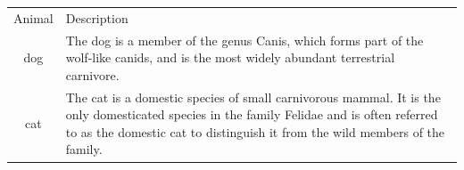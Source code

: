 \documentclass{article}
\begin{document}
	\begin{tabular}{cl}
		Animal & Description \\
		dog & The dog is a member of the genus Canis, which forms part of the wolf-like canids, and is the most widely abundant terrestrial carnivore. \\
		cat & The cat is a domestic species of small carnivorous mammal. It is the only domesticated species in the family Felidae and is often referred to as the domestic cat to distinguish it from the wild members of the family. \\
	\end{tabular}
\end{document}
